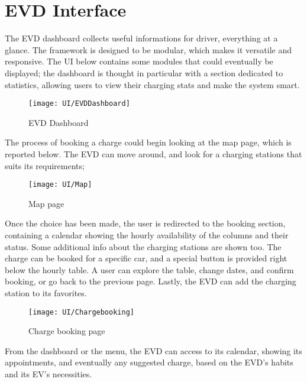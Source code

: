 \section{EVD Interface}
\label{sec: evd_interface}%
The EVD dashboard collects useful informations for driver, everything at a glance. The framework is designed to be modular, which makes it versatile and responsive. The UI below contains some modules that could eventually be displayed; the dashboard is thought in particular with a section dedicated to statistics, allowing users to view their charging stats and make the system smart. 

\begin{figure} [H]
	\begin{center}
		\texttt{[image: UI/EVDDashboard]}
		\caption{EVD Dashboard}
		\label{fig: cd}
	\end{center}
\end{figure}

The process of booking a charge could begin looking at the map page, which is reported below. The EVD can move around, and look for a charging stations that suits its requirements;

\begin{figure} [H]
	\begin{center}
		\texttt{[image: UI/Map]}
		\caption{Map page}
		\label{fig: cd}
	\end{center}
\end{figure}

Once the choice has been made, the user is redirected to the booking section, containing a calendar showing the hourly availability of the columns and their status. Some additional info about the charging stations are shown too. The charge can be booked for a specific car, and a special button is provided right below the hourly table. A user can explore the table, change dates, and confirm booking, or go back to the previous page. Lastly, the EVD can add the charging station to its favorites.

\begin{figure} [H]
	\begin{center}
		\texttt{[image: UI/Chargebooking]}
		\caption{Charge booking page}
		\label{fig: cd}
	\end{center}
\end{figure}

From the dashboard or the menu, the EVD can access to its calendar, showing its appointments, and eventually any suggested charge, based on the EVD’s habits and its EV’s necessities.

